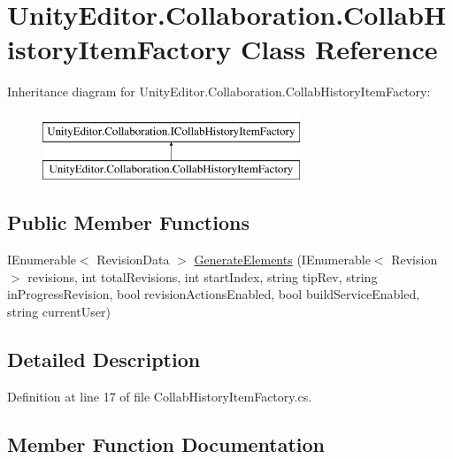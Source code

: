\hypertarget{class_unity_editor_1_1_collaboration_1_1_collab_history_item_factory}{}\section{Unity\+Editor.\+Collaboration.\+Collab\+History\+Item\+Factory Class Reference}
\label{class_unity_editor_1_1_collaboration_1_1_collab_history_item_factory}
Inheritance diagram for Unity\+Editor.\+Collaboration.\+Collab\+History\+Item\+Factory\+:\begin{figure}[H]
\begin{center}
\leavevmode
\includegraphics[height=2.000000cm]{class_unity_editor_1_1_collaboration_1_1_collab_history_item_factory}
\end{center}
\end{figure}
\subsection*{Public Member Functions}
\begin{DoxyCompactItemize}
\item 
I\+Enumerable$<$ Revision\+Data $>$ \mbox{\hyperlink{class_unity_editor_1_1_collaboration_1_1_collab_history_item_factory_addc7995a699cc3f134fdc0381ee8569d}{Generate\+Elements}} (I\+Enumerable$<$ Revision $>$ revisions, int total\+Revisions, int start\+Index, string tip\+Rev, string in\+Progress\+Revision, bool revision\+Actions\+Enabled, bool build\+Service\+Enabled, string current\+User)
\end{DoxyCompactItemize}


\subsection{Detailed Description}


Definition at line 17 of file Collab\+History\+Item\+Factory.\+cs.



\subsection{Member Function Documentation}
\mbox{\label{class_unity_editor_1_1_collaboration_1_1_collab_history_item_factory_addc7995a699cc3f134fdc0381ee8569d}} 
